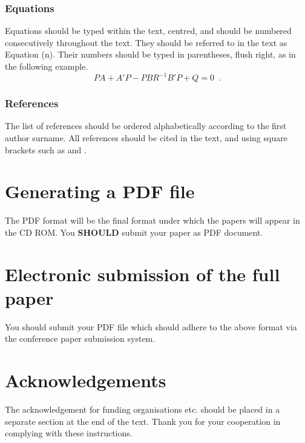 \documentclass{article}
\begin{document}
\subsubsection{Equations}
Equations should be typed within the text, centred, and
should be numbered consecutively throughout the text.
They should be referred to in the text as Equation (n).
Their numbers should be typed in parentheses, flush right,
as in the following example.
\begin{equation}
	    PA + A'P - PBR^{-1}B'P + Q  =  0 \enspace.
\end{equation}

\subsubsection{References}
The list of references should be ordered alphabetically
according to the first author surname. All references
should be cited in the text, and using square brackets such
as \cite{ref01} and \cite{ref02}.

\section{Generating a {PDF} file}
The PDF format will be the final format under which the
papers will appear in the {CD ROM}. You {\bf SHOULD}
submit your paper as {PDF} document.

\section{Electronic submission of the full paper}
You should submit your {PDF} file which should adhere to
the above format via the conference paper submission
system.

\section*{Acknowledgements}
The acknowledgement for funding organisations etc.
should be placed in a separate section at the end of the
text. Thank you for your cooperation in complying with
these instructions.


\noindent

\end{document}

